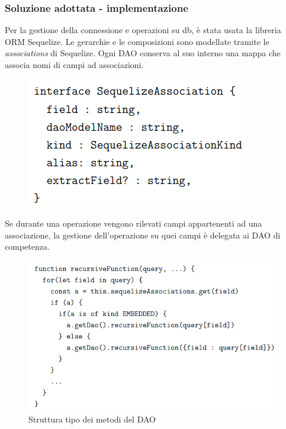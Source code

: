 \documentclass[c]{beamer}
\begin{document}
            \begin{frame}
                \frametitle{Soluzione adottata - implementazione}
                Per la gestione della connessione e operazioni su db, è stata usata la libreria ORM Sequelize.
                \vfill
                Le gerarchie e le composizioni sono modellate tramite le \emph{associations} di Sequelize.
                Ogni DAO conserva al suo interno una mappa che associa nomi di campi ad associazioni.
                \begin{figure}
                    \includegraphics[scale=.5]{Sequelize_assoc.png}
                \end{figure}
            \end{frame}

            \begin{frame}
                Se durante una operazione vengono rilevati campi appartenenti ad una associazione, la gestione dell'operazione su quei campi
                è delegata ai DAO di competenza.
                \begin{figure}
                    \includegraphics[scale=.5]{Resolution_Example.png}
                    \caption{Struttura tipo dei metodi del DAO}
                \end{figure}
            \end{frame}
    
\end{document}
